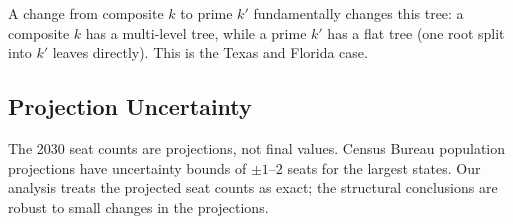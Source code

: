 A change from composite $k$ to prime $k'$ fundamentally changes this tree:
a composite $k$ has a multi-level tree, while a prime $k'$ has a flat tree
(one root split into $k'$ leaves directly).
This is the Texas and Florida case.

\subsection{Projection Uncertainty}

The 2030 seat counts are projections, not final values.
Census Bureau population projections have uncertainty bounds of
$\pm 1$--$2$ seats for the largest states.
Our analysis treats the projected seat counts as exact; the structural
conclusions are robust to small changes in the projections.
